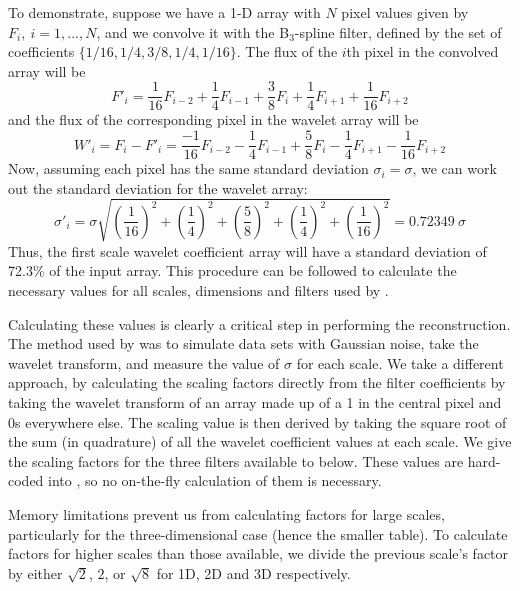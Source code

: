 To demonstrate, suppose we have a 1-D array with $N$ pixel values
given by $F_i,\ i=1,...,N$, and we convolve it with the B$_3$-spline
filter, defined by the set of coefficients
$\{1/16,1/4,3/8,1/4,1/16\}$. The flux of the $i$th pixel in the
convolved array will be
\[
F'_i = \frac{1}{16}F_{i-2} + \frac{1}{4}F_{i-1} + \frac{3}{8}F_{i}
+ \frac{1}{4}F_{i+1} + \frac{1}{16}F_{i+2}
\]
and the flux of the corresponding pixel in the wavelet array will be 
\[
W'_i = F_i - F'_i = \frac{-1}{16}F_{i-2} - \frac{1}{4}F_{i-1} 
+ \frac{5}{8}F_{i} - \frac{1}{4}F_{i+1} - \frac{1}{16}F_{i+2}
\]
Now, assuming each pixel has the same standard deviation
$\sigma_i=\sigma$, we can work out the standard deviation for the
wavelet array:
\[
\sigma'_i = \sigma \sqrt{\left(\frac{1}{16}\right)^2 
  + \left(\frac{1}{4}\right)^2 + \left(\frac{5}{8}\right)^2 
  + \left(\frac{1}{4}\right)^2 + \left(\frac{1}{16}\right)^2}
          = 0.72349\ \sigma
\]
Thus, the first scale wavelet coefficient array will have a standard
deviation of 72.3\% of the input array. This procedure can be followed
to calculate the necessary values for all scales, dimensions and
filters used by \duchamp.

Calculating these values is clearly a critical step in performing the
reconstruction. The method used by \citet{starck02a} was to
simulate data sets with Gaussian noise, take the wavelet transform,
and measure the value of $\sigma$ for each scale. We take a different
approach, by calculating the scaling factors directly from the filter
coefficients by taking the wavelet transform of an array made up of a
1 in the central pixel and 0s everywhere else. The scaling value is
then derived by taking the square root of the sum (in quadrature) of
all the wavelet coefficient values at each scale. We give the scaling
factors for the three filters available to \duchamp below. These
values are hard-coded into \duchamp, so no on-the-fly calculation of
them is necessary.

Memory limitations prevent us from calculating factors for large
scales, particularly for the three-dimensional case (hence the smaller
table). To calculate factors for higher scales than those available,
we divide the previous scale's factor by either $\sqrt{2}$, $2$, or
$\sqrt{8}$ for 1D, 2D and 3D respectively.


